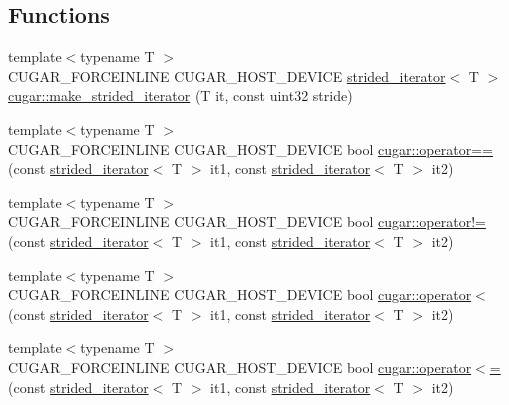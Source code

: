 \subsection*{Functions}
\begin{DoxyCompactItemize}
\item 
{\footnotesize template$<$typename T $>$ }\\C\+U\+G\+A\+R\+\_\+\+F\+O\+R\+C\+E\+I\+N\+L\+I\+NE C\+U\+G\+A\+R\+\_\+\+H\+O\+S\+T\+\_\+\+D\+E\+V\+I\+CE \hyperlink{structcugar_1_1strided__iterator}{strided\+\_\+iterator}$<$ T $>$ \hyperlink{group___iterators_ga18b4b42492eb7224bb23b6d7703d59d3}{cugar\+::make\+\_\+strided\+\_\+iterator} (T it, const uint32 stride)
\item 
{\footnotesize template$<$typename T $>$ }\\C\+U\+G\+A\+R\+\_\+\+F\+O\+R\+C\+E\+I\+N\+L\+I\+NE C\+U\+G\+A\+R\+\_\+\+H\+O\+S\+T\+\_\+\+D\+E\+V\+I\+CE bool \hyperlink{group___iterators_ga72e24473e98fc1cd1bd45b9e55e154ec}{cugar\+::operator==} (const \hyperlink{structcugar_1_1strided__iterator}{strided\+\_\+iterator}$<$ T $>$ it1, const \hyperlink{structcugar_1_1strided__iterator}{strided\+\_\+iterator}$<$ T $>$ it2)
\item 
{\footnotesize template$<$typename T $>$ }\\C\+U\+G\+A\+R\+\_\+\+F\+O\+R\+C\+E\+I\+N\+L\+I\+NE C\+U\+G\+A\+R\+\_\+\+H\+O\+S\+T\+\_\+\+D\+E\+V\+I\+CE bool \hyperlink{group___iterators_ga716fb525ff65fc5c8224b1e46979e8a8}{cugar\+::operator!=} (const \hyperlink{structcugar_1_1strided__iterator}{strided\+\_\+iterator}$<$ T $>$ it1, const \hyperlink{structcugar_1_1strided__iterator}{strided\+\_\+iterator}$<$ T $>$ it2)
\item 
{\footnotesize template$<$typename T $>$ }\\C\+U\+G\+A\+R\+\_\+\+F\+O\+R\+C\+E\+I\+N\+L\+I\+NE C\+U\+G\+A\+R\+\_\+\+H\+O\+S\+T\+\_\+\+D\+E\+V\+I\+CE bool \hyperlink{group___iterators_ga7e34173347793a8a35add6b79d2b1c2b}{cugar\+::operator$<$} (const \hyperlink{structcugar_1_1strided__iterator}{strided\+\_\+iterator}$<$ T $>$ it1, const \hyperlink{structcugar_1_1strided__iterator}{strided\+\_\+iterator}$<$ T $>$ it2)
\item 
{\footnotesize template$<$typename T $>$ }\\C\+U\+G\+A\+R\+\_\+\+F\+O\+R\+C\+E\+I\+N\+L\+I\+NE C\+U\+G\+A\+R\+\_\+\+H\+O\+S\+T\+\_\+\+D\+E\+V\+I\+CE bool \hyperlink{group___iterators_ga863ca4b5ec73bff722711892c9468f44}{cugar\+::operator$<$=} (const \hyperlink{structcugar_1_1strided__iterator}{strided\+\_\+iterator}$<$ T $>$ it1, const \hyperlink{structcugar_1_1strided__iterator}{strided\+\_\+iterator}$<$ T $>$ it2)

\end{DoxyCompactItemize}
